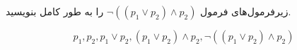 زیرفرمول‌های فرمول
$\neg((p_1\vee p_2)\wedge p_2)$
را به طور کامل بنویسید.
\begin{ans}
$$
p_1,p_2,p_1\vee p_2,(p_1\vee p_2)\wedge p_2,\neg((p_1\vee p_2)\wedge p_2)
$$
\end{ans}
